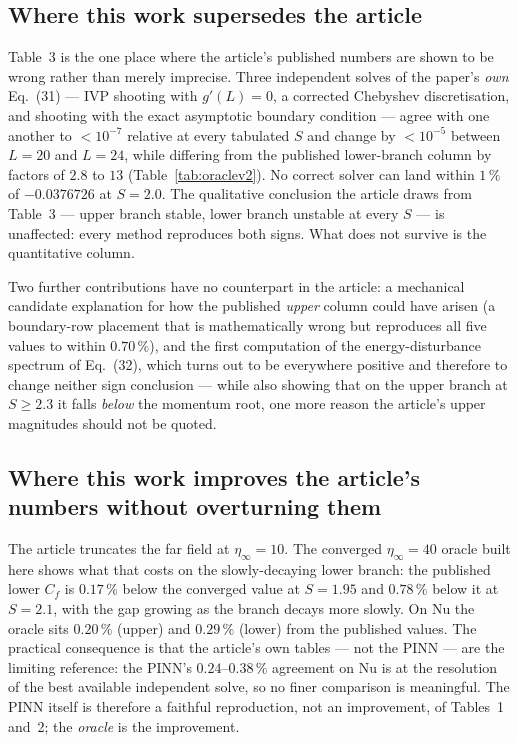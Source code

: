 \documentclass[11pt,a4paper]{article}
\newcommand{\pct}{\,\%}
\begin{document}
\subsection{Where this work supersedes the article}
Table~3 is the one place where the article's published numbers are shown to be wrong rather
than merely imprecise. Three independent solves of the paper's \emph{own} Eq.~(31) --- IVP
shooting with $g'(L)=0$, a corrected Chebyshev discretisation, and shooting with the exact
asymptotic boundary condition --- agree with one another to $<10^{-7}$ relative at every
tabulated $S$ and change by $<10^{-5}$ between $L{=}20$ and $L{=}24$, while differing from
the published lower-branch column by factors of $2.8$ to $13$ (Table~\ref{tab:oraclev2}).
No correct solver can land within $1\pct$ of $-0.0376726$ at $S{=}2.0$. The qualitative
conclusion the article draws from Table~3 --- upper branch stable, lower branch unstable at
every $S$ --- is unaffected: every method reproduces both signs. What does not survive is
the quantitative column.

Two further contributions have no counterpart in the article: a mechanical candidate
explanation for how the published \emph{upper} column could have arisen (a boundary-row
placement that is mathematically wrong but reproduces all five values to within $0.70\pct$),
and the first computation of the energy-disturbance spectrum of Eq.~(32), which turns out to
be everywhere positive and therefore to change neither sign conclusion --- while also
showing that on the upper branch at $S\geq2.3$ it falls \emph{below} the momentum root, one
more reason the article's upper magnitudes should not be quoted.

\subsection{Where this work improves the article's numbers without overturning them}
The article truncates the far field at $\eta_\infty = 10$. The converged $\eta_\infty = 40$
oracle built here shows what that costs on the slowly-decaying lower branch: the published
lower $C_f$ is $0.17\pct$ below the converged value at $S{=}1.95$ and $0.78\pct$ below it at
$S{=}2.1$, with the gap growing as the branch decays more slowly. On $\mathrm{Nu}$ the
oracle sits $0.20\pct$ (upper) and $0.29\pct$ (lower) from the published values. The
practical consequence is that the article's own tables --- not the PINN --- are the limiting
reference: the PINN's $0.24$--$0.38\pct$ agreement on $\mathrm{Nu}$ is at the resolution of
the best available independent solve, so no finer comparison is meaningful. The PINN itself
is therefore a faithful reproduction, not an improvement, of Tables~1 and~2; the
\emph{oracle} is the improvement.
\end{document}
